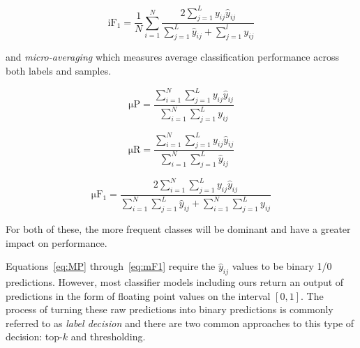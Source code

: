 \documentclass[12pt,journal,compsoc]{IEEEtran}
\begin{document}
\begin{equation}
\mathrm{iF_1} = \frac{1}{N}\sum_{i=1}^{N}\frac{2\sum_{j=1}^{L}y_{ij}\hat{y}_{ij}}{\sum_{j=1}^{L}\hat{y}_{ij}+\sum_{j=1}^{l}y_{ij}}
\label{eq:iF1}
\end{equation}

and \textit{micro-averaging} which measures average classification performance across both labels and samples.

\begin{equation}
\mathrm{\mu P} = \frac{\sum_{i=1}^{N}\sum_{j=1}^{L}y_{ij}\hat{y}_{ij}}{\sum_{i=1}^{N}\sum_{j=1}^{L}y_{ij}}
\label{eq:mP}
\end{equation}

\begin{equation}
\mathrm{\mu R} = \frac{\sum_{i=1}^{N}\sum_{j=1}^{L}y_{ij}\hat{y}_{ij}}{\sum_{i=1}^{N}\sum_{j=1}^{L}\hat{y}_{ij}}
\label{eq:mR}
\end{equation}

\begin{equation}
\mathrm{\mu F_1} = \frac{2\sum_{i=1}^{N}\sum_{j=1}^{L}y_{ij}\hat{y}_{ij}}{\sum_{i=1}^{N}\sum_{j=1}^{L}\hat{y}_{ij}+\sum_{i=1}^{N}\sum_{j=1}^{L}y_{ij}}
\label{eq:mF1}
\end{equation}

For both of these, the more frequent classes will be dominant and have a greater impact on performance.

Equations~\ref{eq:MP} through~\ref{eq:mF1} require the $\hat{y}_{ij}$ values to be binary 1/0 predictions.  However, most classifier models including ours return an output of predictions in the form of floating point values on the interval $[0,1]$. The process of turning these raw predictions into binary predictions is commonly referred to as \textit{label decision} and there are two common approaches to this type of decision: top-$k$ and thresholding.~\cite{Li2017a}

\end{document}
